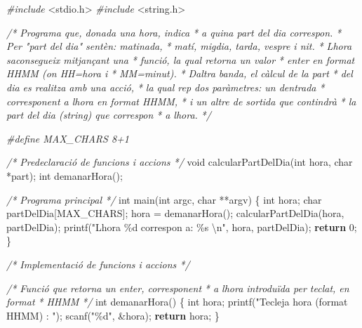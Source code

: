 \documentclass[
]{book}
\newenvironment{Shaded}{\begin{snugshade}}{\end{snugshade}}
\newcommand{\CommentTok}[1]{\textcolor[rgb]{0.56,0.35,0.01}{\textit{#1}}}
\newcommand{\ControlFlowTok}[1]{\textcolor[rgb]{0.13,0.29,0.53}{\textbf{#1}}}
\newcommand{\DataTypeTok}[1]{\textcolor[rgb]{0.13,0.29,0.53}{#1}}
\newcommand{\DecValTok}[1]{\textcolor[rgb]{0.00,0.00,0.81}{#1}}
\newcommand{\ImportTok}[1]{#1}
\newcommand{\NormalTok}[1]{#1}
\newcommand{\PreprocessorTok}[1]{\textcolor[rgb]{0.56,0.35,0.01}{\textit{#1}}}
\newcommand{\SpecialCharTok}[1]{\textcolor[rgb]{0.00,0.00,0.00}{#1}}
\newcommand{\StringTok}[1]{\textcolor[rgb]{0.31,0.60,0.02}{#1}}
\begin{document}
\begin{Shaded}
\begin{Highlighting}[]
\PreprocessorTok{\#include }\ImportTok{\textless{}stdio.h\textgreater{}}
\PreprocessorTok{\#include }\ImportTok{\textless{}string.h\textgreater{}}

\CommentTok{/* Programa que, donada una hora, indica}
\CommentTok{ * a quina part del dia correspon.}
\CommentTok{ * Per "part del dia" s\textquotesingle{}entèn: matinada,}
\CommentTok{ * matí, migdia, tarda, vespre i nit.}
\CommentTok{ * L\textquotesingle{}hora s\textquotesingle{}aconsegueix mitjançant una}
\CommentTok{ * funció, la qual retorna un valor}
\CommentTok{ * enter en format HHMM (on HH=hora i}
\CommentTok{ * MM=minut).}
\CommentTok{ * D\textquotesingle{}altra banda, el càlcul de la part}
\CommentTok{ * del dia es realitza amb una acció,}
\CommentTok{ * la qual rep dos paràmetres: un d\textquotesingle{}entrada}
\CommentTok{ * corresponent a l\textquotesingle{}hora en format HHMM, }
\CommentTok{ * i un altre de sortida que contindrà}
\CommentTok{ * la part del dia (string) que correspon}
\CommentTok{ * a l\textquotesingle{}hora.}
\CommentTok{ */}

\PreprocessorTok{\#define MAX\_CHARS 8+1}

\CommentTok{/* Predeclaració de funcions i accions */}
\DataTypeTok{void}\NormalTok{ calcularPartDelDia(}\DataTypeTok{int}\NormalTok{ hora, }\DataTypeTok{char}\NormalTok{ *part);}
\DataTypeTok{int}\NormalTok{ demanarHora();}

\CommentTok{/* Programa principal */}
\DataTypeTok{int}\NormalTok{ main(}\DataTypeTok{int}\NormalTok{ argc, }\DataTypeTok{char}\NormalTok{ **argv) \{}
    \DataTypeTok{int}\NormalTok{ hora;}
    \DataTypeTok{char}\NormalTok{ partDelDia[MAX\_CHARS];}
\NormalTok{    hora = demanarHora();}
\NormalTok{    calcularPartDelDia(hora, partDelDia);}
\NormalTok{    printf(}\StringTok{"L\textquotesingle{}hora \%d correspon a: \%s }\SpecialCharTok{\textbackslash{}n}\StringTok{"}\NormalTok{, hora, partDelDia);}
    \ControlFlowTok{return} \DecValTok{0}\NormalTok{;}
\NormalTok{\}}

\CommentTok{/* Implementació de funcions i accions */}

\CommentTok{/* Funció que retorna un enter, corresponent}
\CommentTok{ * a l\textquotesingle{}hora introduïda per teclat, en format}
\CommentTok{ * HHMM}
\CommentTok{ */}
\DataTypeTok{int}\NormalTok{ demanarHora() \{}
    \DataTypeTok{int}\NormalTok{ hora;}
\NormalTok{    printf(}\StringTok{"Tecleja hora (format HHMM) : "}\NormalTok{);}
\NormalTok{    scanf(}\StringTok{"\%d"}\NormalTok{, \&hora);}
    \ControlFlowTok{return}\NormalTok{ hora;}
\NormalTok{\}}


\end{Highlighting}
\end{Shaded}
\end{document}
